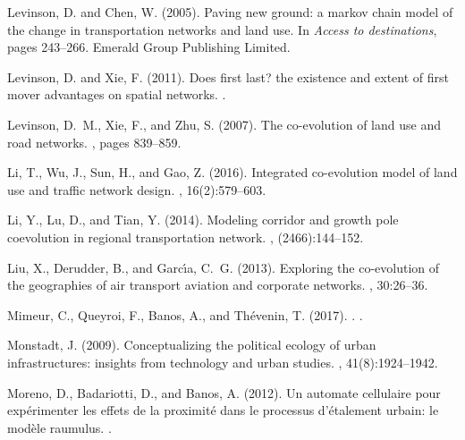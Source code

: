 \documentclass[11pt]{article}
\begin{document}
\begin{thebibliography}{}
Levinson, D. and Chen, W. (2005).
\newblock Paving new ground: a markov chain model of the change in
  transportation networks and land use.
\newblock In {\em Access to destinations}, pages 243--266. Emerald Group
  Publishing Limited.

Levinson, D. and Xie, F. (2011).
\newblock Does first last? the existence and extent of first mover advantages
  on spatial networks.
.

Levinson, D.~M., Xie, F., and Zhu, S. (2007).
\newblock The co-evolution of land use and road networks.
, pages 839--859.

Li, T., Wu, J., Sun, H., and Gao, Z. (2016).
\newblock Integrated co-evolution model of land use and traffic network design.
, 16(2):579--603.

Li, Y., Lu, D., and Tian, Y. (2014).
\newblock Modeling corridor and growth pole coevolution in regional
  transportation network.
, (2466):144--152.

Liu, X., Derudder, B., and Garc{\'\i}a, C.~G. (2013).
\newblock Exploring the co-evolution of the geographies of air transport
  aviation and corporate networks.
, 30:26--36.

Mimeur, C., Queyroi, F., Banos, A., and Th{\'e}venin, T. (2017).
.
.

Monstadt, J. (2009).
\newblock Conceptualizing the political ecology of urban infrastructures:
  insights from technology and urban studies.
, 41(8):1924--1942.

Moreno, D., Badariotti, D., and Banos, A. (2012).
\newblock Un automate cellulaire pour exp{\'e}rimenter les effets de la
  proximit{\'e} dans le processus d'{\'e}talement urbain: le mod{\`e}le
  raumulus.
.


\end{thebibliography}
\end{document}
